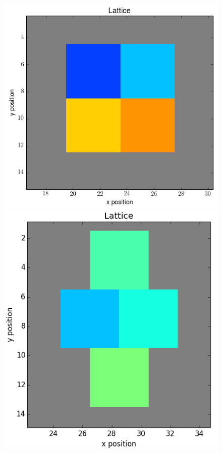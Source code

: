\documentclass[12pt]{article}
\begin{document}
\begin{figure}[h]
	\includegraphics[scale=0.20]{img/4ctc-start}
	\includegraphics[scale=0.20]{img/4ctc-d-start}

\end{figure}
\end{document}
